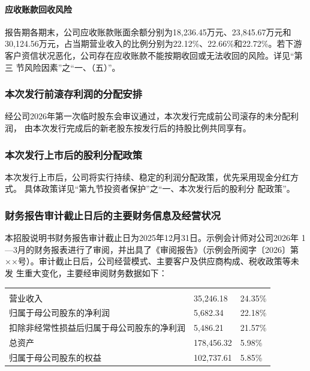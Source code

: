 \paragraph{应收账款回收风险}
报告期各期末，公司应收账款账面余额分别为18,236.45万元、23,845.67万元和
30,124.56万元，占当期营业收入的比例分别为22.12\%、22.66\%和22.72\%。若下游
客户资信状况恶化，公司存在应收账款不能按期收回或无法收回的风险。详见``第三
节\hspace{0.5\ccwd}风险因素''之``一、（五）''。

\subsubsection{本次发行前滚存利润的分配安排}

经公司2026年第一次临时股东会审议通过，本次发行完成前公司滚存的未分配利润，
由本次发行完成后的新老股东按发行后的持股比例共同享有。

\subsubsection{本次发行上市后的股利分配政策}

本次发行上市后，公司将实行持续、稳定的利润分配政策，优先采用现金分红方式。
具体政策详见``第九节\hspace{0.5\ccwd}投资者保护''之``一、本次发行后的股利分
配政策''。

\subsubsection{财务报告审计截止日后的主要财务信息及经营状况}

本招股说明书财务报告审计截止日为2025年12月31日。示例会计师对公司2026年
1—3月的财务报表进行了审阅，并出具了《审阅报告》（示例会所阅字〔2026〕第
××号）。审计截止日后，公司经营模式、主要客户及供应商构成、税收政策等未发
生重大变化，主要经审阅财务数据如下：

\begin{gstab}
\begin{longtable}{|L{52mm}|R{46mm}|R{40mm}|}
\hline
{} &  &  \\ \hline
\endfirsthead
\hline
{} &  &  \\ \hline
\endhead
营业收入 & 35,246.18 & 24.35\% \\ \hline
归属于母公司股东的净利润 & 5,682.34 & 22.18\% \\ \hline
扣除非经常性损益后归属于母公司股东的净利润 & 5,486.21 & 21.57\% \\ \hline
总资产 & 178,456.32 & 5.98\% \\ \hline
归属于母公司股东的权益 & 102,737.61 & 5.85\% \\ \hline
\end{longtable}
\end{gstab}

